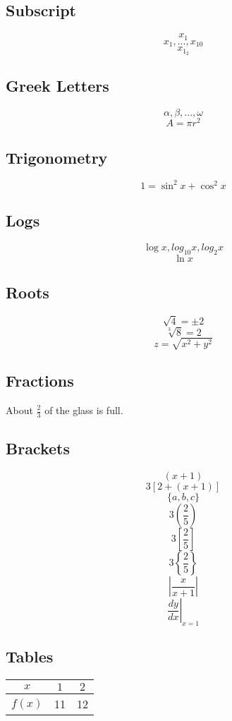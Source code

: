 \documentclass[11pt]{article}
\begin{document}
\subsection{Subscript}
$$x_1$$
$$x_1, ..., x_{10}$$
$$x_{1_2}$$

\subsection{Greek Letters}
$$\alpha, \beta, ..., \omega$$
$$A=\pi r^2$$

\subsection{Trigonometry}
$$1=\sin^2{x} + \cos^2{x}$$

\subsection{Logs}
$$\log{x}, log_{10}{x}, log_2{x}$$
$$\ln{x}$$

\subsection{Roots}
$$\sqrt{4}=\pm2$$
$$\sqrt[3]{8}=2$$
$$z=\sqrt{x^2+y^2}$$

\subsection{Fractions}

About $\frac{2}{3}$ of the glass is full.\newline

\subsection{Brackets}
$$(x+1)$$
$$3[2+(x+1)]$$
$$\{a,b,c\}$$
$$3\left(\frac{2} {5} \right)$$
$$3\left[\frac{2} {5} \right]$$
$$3\left\{\frac{2} {5} \right\}$$
$$\left|\frac{x}{x+1} \right|$$
$$\left. \frac{dy}{dx} \right|_{x=1}$$

\subsection{Tables}
\begin{tabular}{|c|cc|}

\hline
$x$ & $1$ & $2$ \\ \hline
$f(x)$ & 11 & 12 \\ \hline

\end{tabular} \newline
\end{document}
